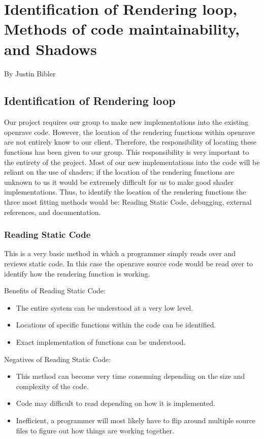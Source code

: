 \documentclass[10pt,journal,compsoc,draftclsnofoot]{IEEEtran}
\begin{document}
\newpage

\section{Identification of Rendering loop, Methods of code maintainability, and Shadows}
\large{By Justin Bibler}

\normalsize
\subsection{Identification of Rendering loop}
Our project requires our group to make new implementations into the existing openrave code.
However, the location of the rendering functions within openrave are not entirely know to our client.
Therefore, the responsibility of locating these functions has been given to our group.
This responsibility is very important to the entirety of the project.
Most of our new implementations into the code will be reliant on the use of shaders;
 if the location of the rendering functions are unknown to us it would be extremely difficult for us to make good shader implementations.
Thus, to identify the location of the rendering functions the three most fitting methods would be: Reading Static Code, debugging, external references, and documentation.

\subsubsection{Reading Static Code}
This is a very basic method in which a programmer simply reads over and reviews static code.
In this case the openrave source code would be read over to identify how the rendering function is working.

Benefits of Reading Static Code:
\begin{itemize}
\item The entire system can be understood at a very low level.
\item Locations of specific functions within the code can be identified.
\item Exact implementation of functions can be understood.
\end{itemize}

Negatives of Reading Static Code:
\begin{itemize}
\item This method can become very time consuming depending on the size and complexity of the code.
\item Code may difficult to read depending on how it is implemented.
\item Inefficient, a programmer will most likely have to flip around multiple source files to figure out how things are working together.
\end{itemize}
\end{document}
